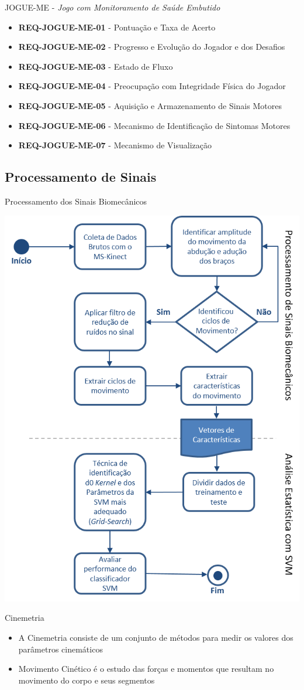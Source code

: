 \documentclass{beamer}
\begin{document}
\begin{frame}{JOGUE-ME - \textit{Jogo com Monitoramento de Saúde Embutido}}
	\begin{block}{}
		\begin{itemize}
			\item	\textbf{REQ-JOGUE-ME-01} - Pontuação e Taxa de Acerto
			\item	\textbf{REQ-JOGUE-ME-02} - Progresso e Evolução do Jogador e dos Desafios
			\item	\textbf{REQ-JOGUE-ME-03} - Estado de Fluxo
			\item	\textbf{REQ-JOGUE-ME-04} - Preocupação com Integridade Física do Jogador
			\item	\textbf{REQ-JOGUE-ME-05} - Aquisição e Armazenamento de Sinais Motores
			\item	\textbf{REQ-JOGUE-ME-06} - Mecanismo de Identificação de Sintomas Motores
			\item	\textbf{REQ-JOGUE-ME-07} - Mecanismo de Visualização
		\end{itemize}
	\end{block}
\end{frame}

\subsection{Processamento de Sinais}
\begin{frame}{Processamento dos Sinais Biomecânicos}
  \begin{block}{}
      \center \includegraphics[height=2.4 in]{img/biomecprocessor2.png}
  \end{block}
\end{frame}


\begin{frame}{Cinemetria}
  \begin{block}{}
      \begin{itemize}
	 \item A Cinemetria consiste de um conjunto de métodos para medir os valores dos parâmetros cinemáticos
	 \item Movimento Cinético é o estudo das forças e momentos que resultam no movimento do corpo e seus segmentos
       \end{itemize}
  \end{block}
\end{frame}
\end{document}
